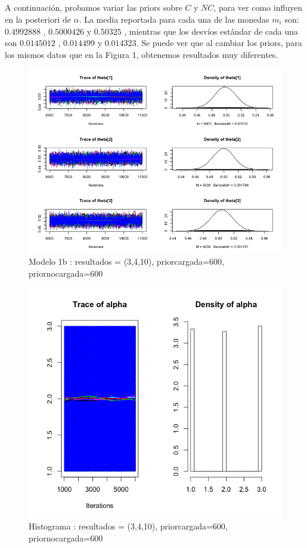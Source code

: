 \documentclass[a4paper]{article}
\begin{document}
\subsection{ }
A continuación, probamos variar las priors sobre $C$ y $NC$, para ver como influyen
en la posteriori de $\alpha$. La media reportada para cada una de las monedas $m_i$ son:
$0.4992888$ , $0.5000426$ y $0.50325$ , mientras que los desvíos estándar de cada una son
$0.0145012$ , $0.014499$ y $0.014323$. Se puede ver que al cambiar los priors, para los 
mismos datos que en la Figura 1, obtenemos resultados muy diferentes.

\begin{figure}[h!]
\centering
\includegraphics[scale=0.5] {img4.png}
\caption{ Modelo 1b : resultados = (3,4,10), priorcargada=600, priornocargada=600 }
\end{figure}

\begin{figure}[h!]
\centering
\includegraphics[scale=0.5] {img3.png}
\caption{ Histograma : resultados = (3,4,10), priorcargada=600, priornocargada=600 }
\end{figure}
\end{document}

